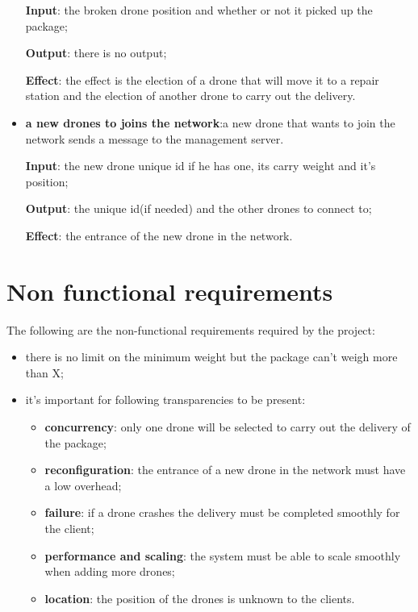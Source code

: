 \documentclass[a4paper, oneside]{memoir}
\begin{document}
\begin{itemize}
	\textbf{Input}: the broken drone position and whether or not it picked up the package;

	\textbf{Output}: there is no output;

	\textbf{Effect}: the effect is the election of a drone that will move it to a repair station and the election of another drone to carry out the delivery.

\item \textbf{a new drones to joins the network}:a new drone that wants to join the network sends a message to the management server.

	\textbf{Input}: the new drone unique id if he has one, its carry weight and it's position;

	\textbf{Output}: the unique id(if needed) and the other drones to connect to;

	\textbf{Effect}: the entrance of the new drone in the network.

\end{itemize}

\section{Non functional requirements}


The following are the non-functional requirements required by the project:
\begin{itemize}
\item there is no limit on the minimum weight but the package can't weigh more than X;
\item it's important for following transparencies to be present:
	\begin{itemize}
	\item \textbf{concurrency}: only one drone will be selected to carry out the delivery of the package;
	\item \textbf{reconfiguration}: the entrance of a new drone in the network must have a low overhead;
	\item \textbf{failure}: if a drone crashes the delivery must be completed smoothly for the client;
	\item \textbf{performance and scaling}: the system must be able to scale smoothly when adding more drones;
	\item \textbf{location}: the position of the drones is unknown to the clients.
	\end{itemize}
\end{itemize}
\end{document}
